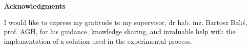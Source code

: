 \vspace*{\fill}
\begin{center}
\textbf{Acknowledgments}
\end{center}
\begin{center}
\begin{minipage}{0.62\textwidth}
I would like to express my gratitude to my supervisor, dr hab. inż. Bartosz Baliś, prof. AGH, for his guidance, knowledge sharing, and invaluable help with the implementation of a solution used in the experimental process.
\end{minipage}
\end{center}
\vspace*{\fill}
\newpage
\thispagestyle{empty}
\cleardoublepage
